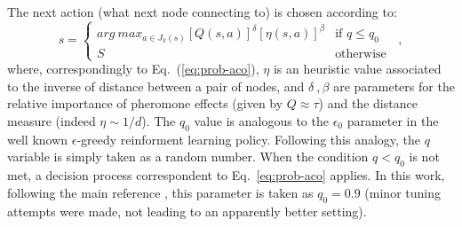 \documentclass[10pt]{article}
\begin{document}
The next action (what next node connecting to) is chosen according to:
\begin{equation}
s = \begin{cases} arg~max_{a \in J_k(s)} [Q(s,a)]^\delta [\eta(s,a)]^\beta & \mbox{if } q \leq q_0 \\ S & \mbox{otherwise } \end{cases} ~,
\label{eq:antq-choice}
\end{equation}
where, correspondingly to Eq.~(\ref{eq:prob-aco}), $\eta$ is an heuristic value associated to the inverse of distance between a pair of nodes, and $\delta~, \beta$ are parameters for the relative importance of pheromone effects (given by $Q \approx \tau$) and the distance measure (indeed $\eta \sim 1/d$).
The $q_0$ value is analogous to the $\epsilon_0$ parameter in the well known $\epsilon$-greedy reinforment learning policy. Following this analogy, the $q$ variable is simply taken as a random number. When the condition $q<q_0$ is not met, a decision process correspondent to Eq.~\ref{eq:prob-aco} applies. In this work, following the main reference \cite{undici}, this parameter is taken as $q_0=0.9$ (minor tuning attempts were made, not leading to an apparently better setting).
\end{document}
